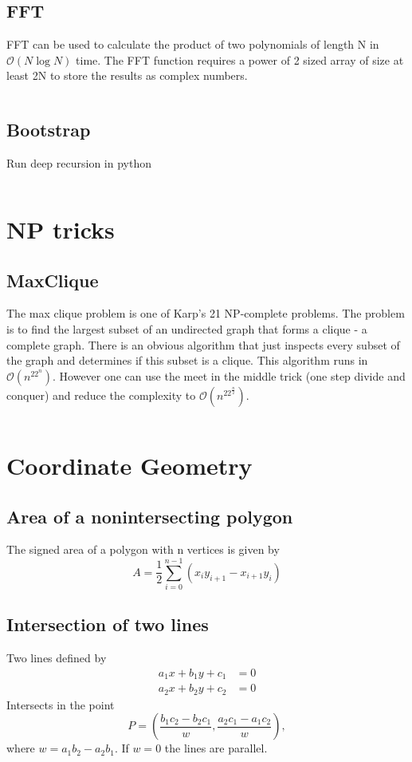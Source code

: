 \documentclass[8pt,a4paper,landscape,oneside]{amsart}
\newcommand{\codej}[1]{\inputminted[fontsize=\large,tabsize=2,baselinestretch=1]{java}{src/#1}}
\newcommand{\codep}[1]{\inputminted[fontsize=\large,tabsize=2,baselinestretch=1]{py}{src/#1}}
\newcommand{\bigO}{\mathcal{O}}
\begin{document}
\begin{multicols*}{2}
\begin{large}
    \subsection{FFT}
        FFT can be used to calculate the product of two polynomials of length N in $\bigO(N\log N)$ time. The FFT function requires a power of 2 sized array of size at least 2N to store the results as complex numbers.
        \codep{misc/fft.py}
    \subsection{Bootstrap}
        Run deep recursion in python
        \codep{misc/bootstrap.py}

\section{NP tricks}
    \subsection{MaxClique}
        The max clique problem is one of Karp's 21 NP-complete problems. The problem is to find the largest subset of an undirected graph that forms a clique - a complete graph. There is an obvious algorithm that just inspects every subset of the graph and determines if this subset is a clique. This algorithm runs in $\bigO(n^22^n)$. However one can use the meet in the middle trick (one step divide and conquer) and reduce the complexity to $\bigO(n^22^{\frac{n}{2}})$.
        \codej{npcomplete/MaxClique.java}
\section{Coordinate Geometry}
    \subsection{Area of a nonintersecting polygon}
        The signed area of a polygon with n vertices is given by
        $$A = \frac{1}{2}\sum_{i=0}^{n-1}(x_iy_{i+1} - x_{i+1}y_i)$$
    \subsection{Intersection of two lines}
        Two lines defined by
        \begin{align*}
            a_1x + b_1y + c_1 &= 0 \\
            a_2x + b_2y + c_2 &= 0
        \end{align*}
        Intersects in the point
        $$P = (\frac{b_1c_2 - b_2c_1}{w}, \frac{a_2c_1 - a_1c_2}{w}),$$
        where $w = a_1b_2 - a_2b_1$. If $w = 0$ the lines are parallel.

\end{large}
\end{multicols*}
\end{document}
